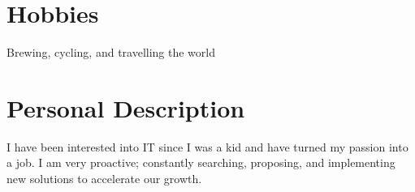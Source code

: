 \documentclass[]{template/friggeri-cv} %
\begin{document}

\section{Hobbies}

{Brewing, cycling, and travelling the world}

\section{Personal Description}
        {
          I have been interested into IT since I was a kid and have turned my passion into a job.
          I am very proactive; constantly searching, proposing, and implementing new solutions to accelerate our growth.
        }
\end{document}
